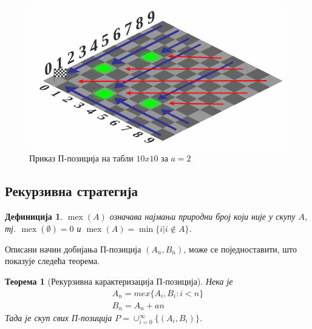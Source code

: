 \documentclass[a4paper]{article}
\newtheorem{theorem}{Теорема}
\newtheorem{definition}{Дефиниција}
\DeclareMathOperator{\mex}{mex}
\begin{document}
\begin{figure}[H]
	\caption{Приказ П-позиција на табли $ 10x10 $ за $ a = 2 $}
	\label{fig:sahovska_tabla_pozicije_a_2}
	\begin{center}
		\includegraphics[width=\textwidth]{10x10_1.png}
	\end{center}
\end{figure}

\subsection{Рекурзивна стратегија}

\begin{definition}
	\label{def:mex}
	$\mex(A)$ означава најмањи природни број који није у скупу $ A $, тј. $ \mex(\emptyset)=0 $ и
$ \mex(A)=\min\{i | i\notin A\} $.
\end{definition}

Описани начин добијања П-позиција $ (A_{n}, B_{n}) $, може се поједноставити, што показује следећа теорема. 

\begin{theorem} [Рекурзивна карактеризација П-позиција]
	\label{thm:reukrzivna_strategija}
	Нека је 
	\begin{eqnarray}
		A_{n} = mex \{ A_{i}, B_{i} : i < n \} \\
		B_{n} = A_{n} + an 
	\end{eqnarray}
	Тада је скуп свих П-позиција
	$ P = \cup_{i=0}^{\infty} \{(A_{i},B_{i})\} $.
\end{theorem}
\end{document}
